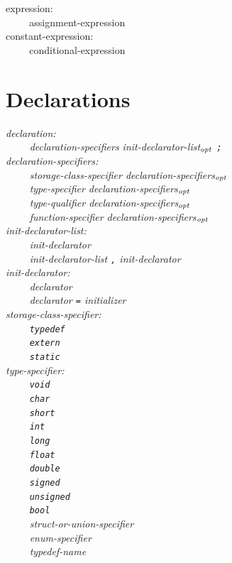 \documentclass[12pt]{report}
\def\|{\verb|}
\newcommand\opt{$_{{\it opt}}$ }
\begin{document}
\noindent
expression:\\
\|    | assignment-expression\\

\noindent
constant-expression:\\
\|    | conditional-expression\\

\rm
\section{Declarations}
\it
\noindent
declaration:\\
\|    | declaration-specifiers init-declarator-list\opt \verb+;+\\

\noindent
declaration-specifiers:\\
\|    | storage-class-specifier declaration-specifiers\opt\\
\|    | type-specifier declaration-specifiers\opt\\
\|    | type-qualifier declaration-specifiers\opt\\
\|    | function-specifier declaration-specifiers\opt\\

\noindent
init-declarator-list:\\
\|    | init-declarator\\
\|    | init-declarator-list \verb+,+ init-declarator\\

\noindent
init-declarator:\\
\|    | declarator\\
\|    | declarator \verb+=+ initializer\\

\noindent
storage-class-specifier:\\
\|    | \verb+typedef+\\
\|    | \verb+extern+\\
\|    | \verb+static+\\

\noindent
type-specifier:\\
\|    | \verb+void+\\
\|    | \verb+char+\\
\|    | \verb+short+\\
\|    | \verb+int+\\
\|    | \verb+long+\\
\|    | \verb+float+\\
\|    | \verb+double+\\
\|    | \verb+signed+\\
\|    | \verb+unsigned+\\
\|    | \verb+bool+\\
\|    | struct-or-union-specifier\\
\|    | enum-specifier\\
\|    | typedef-name\\
\end{document}
